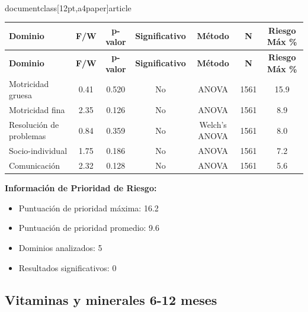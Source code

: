 \\documentclass[12pt,a4paper]{article}
\begin{document}
\begin{longtable}{|l|c|c|c|c|c|c|}
\hline
\textbf{Dominio} & \textbf{F/W} & \textbf{p-valor} & \textbf{Significativo} & \textbf{Método} & \textbf{N} & \textbf{Riesgo Máx \%} \\
\hline
\endfirsthead

\hline
\textbf{Dominio} & \textbf{F/W} & \textbf{p-valor} & \textbf{Significativo} & \textbf{Método} & \textbf{N} & \textbf{Riesgo Máx \%} \\
\hline
\endhead

\hline
\endfoot

\hline
\endlastfoot

Motricidad gruesa & 0.41 & 0.520 & No & ANOVA & 1561 & 15.9 \\
Motricidad fina & 2.35 & 0.126 & No & ANOVA & 1561 & 8.9 \\
Resolución de problemas & 0.84 & 0.359 & No & Welch's ANOVA & 1561 & 8.0 \\
Socio-individual & 1.75 & 0.186 & No & ANOVA & 1561 & 7.2 \\
Comunicación & 2.32 & 0.128 & No & ANOVA & 1561 & 5.6 \\

\end{longtable}


\textbf{Información de Prioridad de Riesgo:}
\begin{itemize}
\item Puntuación de prioridad máxima: 16.2
\item Puntuación de prioridad promedio: 9.6
\item Dominios analizados: 5
\item Resultados significativos: 0
\end{itemize}


\subsection{Vitaminas y minerales 6-12 meses}
\end{document}
